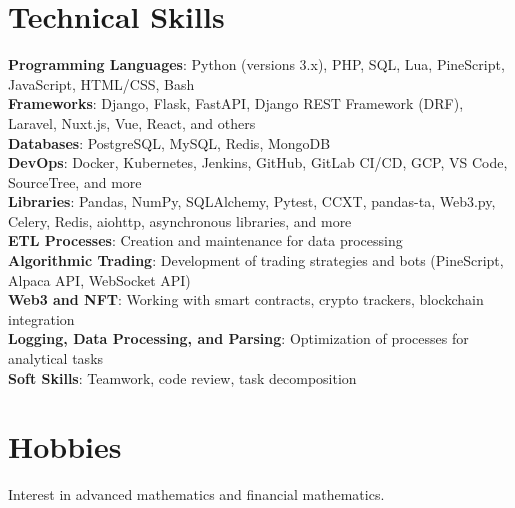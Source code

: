 \documentclass[letterpaper,11pt]{article}
\begin{document}
\section{Technical Skills}
\begin{itemize}[leftmargin=0.15in, label={}]
    \small{\item{
        \textbf{Programming Languages}{: Python (versions 3.x), PHP, SQL, Lua, PineScript, JavaScript, HTML/CSS, Bash} \\
        \textbf{Frameworks}{: Django, Flask, FastAPI, Django REST Framework (DRF), Laravel, Nuxt.js, Vue, React, and others} \\
        \textbf{Databases}{: PostgreSQL, MySQL, Redis, MongoDB} \\
        \textbf{DevOps}{: Docker, Kubernetes, Jenkins, GitHub, GitLab CI/CD, GCP, VS Code, SourceTree, and more} \\
        \textbf{Libraries}{: Pandas, NumPy, SQLAlchemy, Pytest, CCXT, pandas-ta, Web3.py, Celery, Redis, aiohttp, asynchronous libraries, and more} \\
        \textbf{ETL Processes}{: Creation and maintenance for data processing} \\
        \textbf{Algorithmic Trading}{: Development of trading strategies and bots (PineScript, Alpaca API, WebSocket API)} \\
        \textbf{Web3 and NFT}{: Working with smart contracts, crypto trackers, blockchain integration} \\
        \textbf{Logging, Data Processing, and Parsing}{: Optimization of processes for analytical tasks} \\
        \textbf{Soft Skills}{: Teamwork, code review, task decomposition}
    }}
\end{itemize}
\section{Hobbies}
\begin{itemize}[leftmargin=0.15in, label={}]
    \small{\item{
        Interest in advanced mathematics and financial mathematics.
    }}
\end{itemize}
\end{document}

